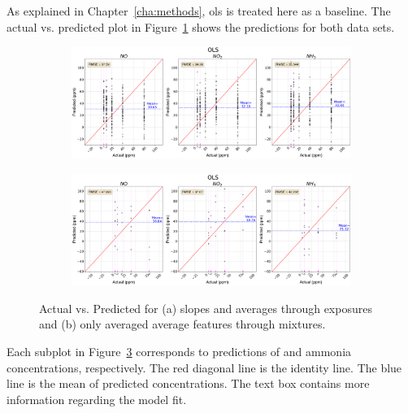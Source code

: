 As explained in Chapter~\ref{cha:methods}, \acrshort{ols} is treated here as a baseline. The actual vs. predicted plot in Figure~\ref{fig:ols-exposures} shows the predictions for both data sets.

\begin{figure}[!htb]
	\centering
	
	\begin{subfigure}[b]{1\textwidth}
		\includegraphics[width=1\linewidth]{../figures/ols-act-vs-pred.png}
		\caption{}
		\label{fig:ols-exposures} 
	\end{subfigure}
	
	\begin{subfigure}[b]{1\textwidth}
		\includegraphics[width=1\linewidth]{../figures/ols-avg-act-vs-pred.png}
		\caption{}
		\label{fig:ols-averaged}
	\end{subfigure}
	
	\caption{Actual vs. Predicted for (a) slopes and averages through exposures and (b) only averaged average features through mixtures.}
	\label{fig:ols-both}
\end{figure}

Each subplot  in Figure~\ref{fig:ols-both} corresponds to predictions of \nox and ammonia concentrations, respectively. The red diagonal line is the identity line. The blue line is the mean of predicted concentrations. The text box contains more information regarding the model fit.
\label{fig:OLS-ACTUAL-VS-PRED}

\clearpage
